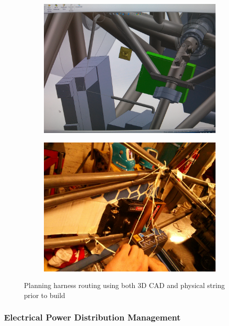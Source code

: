 \begin{figure}
	\centering
	\begin{subfigure}[b]{0.4\textwidth}
		\includegraphics[width=\textwidth]{Harness_CAD.jpg}
		\label{fig:Harness_CAD}
	\end{subfigure}
	\begin{subfigure}[b]{0.4\textwidth}
		\includegraphics[width=\textwidth]{Harness_String_Lengths.jpg}
		\label{fig:Harness_String_Lengths}
	\end{subfigure}
	\caption{Planning harness routing using both 3D CAD and physical string prior to build}
	\label{fig:Harness_Planning}
\end{figure}

\subsubsection{Electrical Power Distribution Management}

